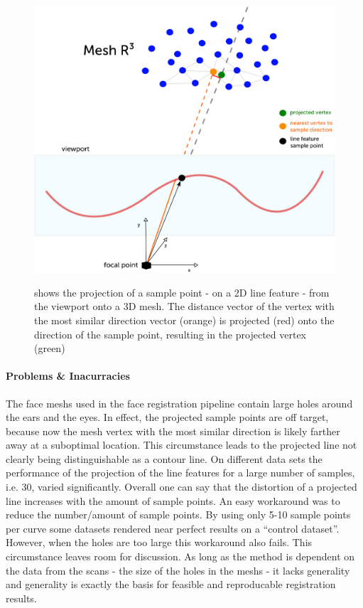 \begin{figure}[h!]
    \includegraphics[width=\textwidth]{./resources/figures/projection.eps}
\label{fig:projectio}
\caption{shows the projection of a sample point - on a 2D line feature - from the viewport onto a 3D mesh. The distance vector of the vertex with the most similar direction vector (orange) is projected (red) onto the direction of the sample point, resulting in the projected vertex (green)}
\end{figure}
\paragraph{Problems \& Inacurracies}
The face meshs used in the face registration pipeline contain large holes around the ears and the eyes. In effect, the projected sample points are off target, because now the mesh vertex with the most similar direction is likely farther away at a suboptimal location. This circumstance leads to the projected line not clearly being distinguishable as a contour line. On different data sets the performance of the projection of the line features for a large number of
samples, i.e. 30, varied significantly. Overall one can say that the distortion of a projected line increases with the amount of sample points.
An easy workaround was to reduce the number/amount of sample points. By using only 5-10 sample points per curve some datasets rendered near perfect results on a ``control dataset''.  
However, when the holes are too large this workaround also fails. This circumstance leaves room for discussion. As long as the method is dependent on the data from the scans - the size of the holes in the meshs - it lacks generality and generality is exactly the basis for feasible and reproducable registration results.\\

